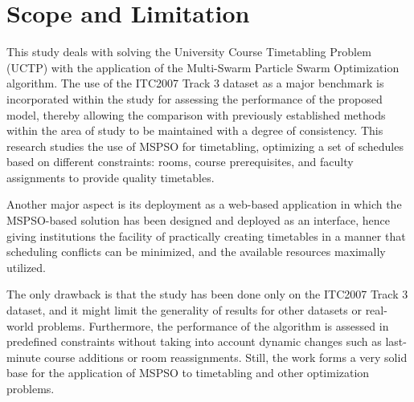 \section{Scope and Limitation}
\label{sec:scopeandlimitation}

This study deals with solving the University Course Timetabling Problem (UCTP) with the application of the Multi-Swarm Particle Swarm Optimization algorithm. The use of the ITC2007 Track 3 dataset as a major benchmark is incorporated within the study for assessing the performance of the proposed model, thereby allowing the comparison with previously established methods within the area of study to be maintained with a degree of consistency. This research studies the use of MSPSO for timetabling, optimizing a set of schedules based on different constraints: rooms, course prerequisites, and faculty assignments to provide quality timetables.

Another major aspect is its deployment as a web-based application in which the MSPSO-based solution has been designed and deployed as an interface, hence giving institutions the facility of practically creating timetables in a manner that scheduling conflicts can be minimized, and the available resources maximally utilized.

The only drawback is that the study has been done only on the ITC2007 Track 3 dataset, and it might limit the generality of results for other datasets or real-world problems. Furthermore, the performance of the algorithm is assessed in predefined constraints without taking into account dynamic changes such as last-minute course additions or room reassignments. Still, the work forms a very solid base for the application of MSPSO to timetabling and other optimization problems.
